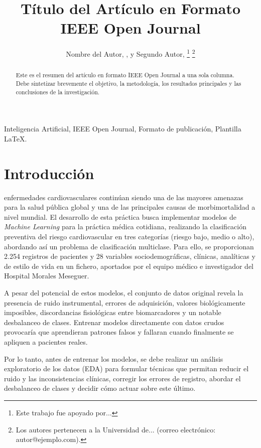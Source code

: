 \documentclass[journal,onecolumn]{IEEEtran}
\begin{document}
\title{Título del Artículo en Formato IEEE Open Journal}

\author{Nombre del Autor, , y Segundo Autor, 
\thanks{Este trabajo fue apoyado por...}
\thanks{Los autores pertenecen a la Universidad de... (correo electrónico: autor@ejemplo.com).}}

\maketitle

\begin{abstract}
Este es el resumen del artículo en formato IEEE Open Journal a una sola columna. Debe sintetizar brevemente el objetivo, la metodología, los resultados principales y las conclusiones de la investigación.
\end{abstract}

\begin{IEEEkeywords}
Inteligencia Artificial, IEEE Open Journal, Formato de publicación, Plantilla LaTeX.
\end{IEEEkeywords}


\section{Introducción}
 enfermedades cardiovasculares continúan siendo una de las mayores amenazas para la salud pública global y una de las principales causas de morbimortalidad a nivel mundial. El desarrollo de esta práctica busca implementar modelos de \textit{Machine Learning} para la práctica médica cotidiana, realizando la clasificación preventiva del riesgo cardiovascular en tres categorías (riesgo bajo, medio o alto), abordando así un problema de clasificación multiclase. Para ello, se proporcionan 2.254 registros de pacientes y 28 variables sociodemográficas, clínicas, analíticas y de estilo de vida en un fichero, aportados por el equipo médico e investigador del Hospital Morales Meseguer.

A pesar del potencial de estos modelos, el conjunto de datos original revela la presencia de ruido instrumental, errores de adquisición, valores biológicamente imposibles, discordancias fisiológicas entre biomarcadores y un notable desbalanceo de clases. Entrenar modelos directamente con datos crudos provocaría que aprendieran patrones falsos y fallaran cuando finalmente se apliquen a pacientes reales.

Por lo tanto, antes de entrenar los modelos, se debe realizar un análisis exploratorio de los datos (EDA) para formular técnicas que permitan reducir el ruido y las inconsistencias clínicas, corregir los errores de registro, abordar el desbalanceo de clases y decidir cómo actuar sobre este último.
\end{document}
